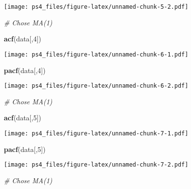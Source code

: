 \documentclass[
]{article}
\newenvironment{Shaded}{\begin{snugshade}}{\end{snugshade}}
\newcommand{\CommentTok}[1]{\textcolor[rgb]{0.56,0.35,0.01}{\textit{#1}}}
\newcommand{\DecValTok}[1]{\textcolor[rgb]{0.00,0.00,0.81}{#1}}
\newcommand{\KeywordTok}[1]{\textcolor[rgb]{0.13,0.29,0.53}{\textbf{#1}}}
\newcommand{\NormalTok}[1]{#1}
\begin{document}
\texttt{[image: ps4\_files/figure-latex/unnamed-chunk-5-2.pdf]}

\begin{Shaded}
\begin{Highlighting}[]
\CommentTok{# Chose MA(1)}
\end{Highlighting}
\end{Shaded}

\begin{Shaded}
\begin{Highlighting}[]
\KeywordTok{acf}\NormalTok{(data[,}\DecValTok{4}\NormalTok{])}
\end{Highlighting}
\end{Shaded}

\texttt{[image: ps4\_files/figure-latex/unnamed-chunk-6-1.pdf]}

\begin{Shaded}
\begin{Highlighting}[]
\KeywordTok{pacf}\NormalTok{(data[,}\DecValTok{4}\NormalTok{])}
\end{Highlighting}
\end{Shaded}

\texttt{[image: ps4\_files/figure-latex/unnamed-chunk-6-2.pdf]}

\begin{Shaded}
\begin{Highlighting}[]
\CommentTok{# Chose MA(1)}
\end{Highlighting}
\end{Shaded}

\begin{Shaded}
\begin{Highlighting}[]
\KeywordTok{acf}\NormalTok{(data[,}\DecValTok{5}\NormalTok{])}
\end{Highlighting}
\end{Shaded}

\texttt{[image: ps4\_files/figure-latex/unnamed-chunk-7-1.pdf]}

\begin{Shaded}
\begin{Highlighting}[]
\KeywordTok{pacf}\NormalTok{(data[,}\DecValTok{5}\NormalTok{])}
\end{Highlighting}
\end{Shaded}

\texttt{[image: ps4\_files/figure-latex/unnamed-chunk-7-2.pdf]}

\begin{Shaded}
\begin{Highlighting}[]
\CommentTok{# Chose MA(1)}
\end{Highlighting}
\end{Shaded}
\end{document}
